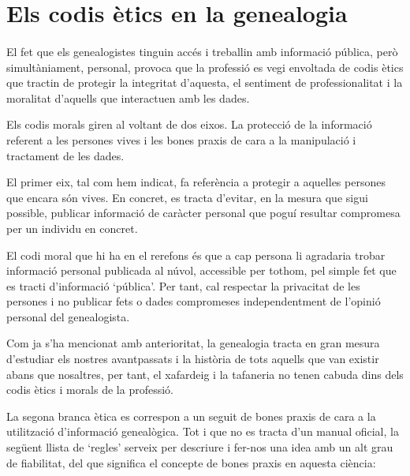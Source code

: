 \section{Els codis ètics en la genealogia}

    \paragraph{}
    El fet que els genealogistes tinguin accés i treballin amb informació pública, però simultàniament, personal, provoca que la professió es vegi envoltada de codis ètics que tractin de protegir la integritat d'aquesta, el sentiment de professionalitat i la moralitat d'aquells que interactuen amb les dades.

    Els codis morals giren al voltant de dos eixos. La protecció de la informació referent a les persones vives i les bones praxis de cara a la manipulació i tractament de les dades.

    El primer eix, tal com hem indicat, fa referència a protegir a aquelles persones que encara són vives. En concret, es tracta d'evitar, en la mesura que sigui possible, publicar informació de caràcter personal que poguí resultar compromesa per un individu en concret.

    El codi moral que hi ha en el rerefons és que a cap persona li agradaria trobar informació personal publicada al núvol, accessible per tothom, pel simple fet que es tracti d'informació `pública'. Per tant, cal respectar la privacitat de les persones i no publicar fets o dades compromeses independentment de l'opinió personal del genealogista.

    Com ja s'ha mencionat amb anterioritat, la genealogia tracta en gran mesura d'estudiar els nostres avantpassats i la història de tots aquells que van existir abans que nosaltres, per tant, el xafardeig i la tafaneria no tenen cabuda dins dels codis ètics i morals de la professió.

    La segona branca ètica es correspon a un seguit de bones praxis de cara a la utilització d'informació genealògica. Tot i que no es tracta d'un manual oficial, la següent llista de `regles' serveix per descriure i fer-nos una idea amb un alt grau de fiabilitat, del que significa el concepte de bones praxis en aquesta ciència:

